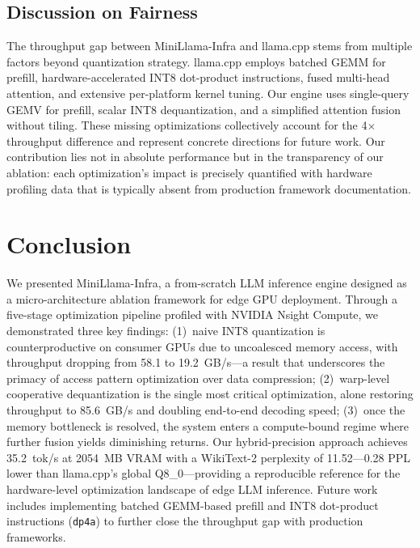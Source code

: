 \documentclass[conference]{IEEEtran}
\begin{document}
\subsection{Discussion on Fairness}
The throughput gap between MiniLlama-Infra and llama.cpp stems from multiple factors beyond quantization strategy. llama.cpp employs batched GEMM for prefill, hardware-accelerated INT8 dot-product instructions, fused multi-head attention, and extensive per-platform kernel tuning. Our engine uses single-query GEMV for prefill, scalar INT8 dequantization, and a simplified attention fusion without tiling. These missing optimizations collectively account for the 4$\times$ throughput difference and represent concrete directions for future work. Our contribution lies not in absolute performance but in the transparency of our ablation: each optimization's impact is precisely quantified with hardware profiling data that is typically absent from production framework documentation.

\section{Conclusion}

We presented MiniLlama-Infra, a from-scratch LLM inference engine designed as a micro-architecture ablation framework for edge GPU deployment. Through a five-stage optimization pipeline profiled with NVIDIA Nsight Compute, we demonstrated three key findings: (1)~naive INT8 quantization is counterproductive on consumer GPUs due to uncoalesced memory access, with throughput dropping from 58.1 to 19.2~GB/s---a result that underscores the primacy of access pattern optimization over data compression; (2)~warp-level cooperative dequantization is the single most critical optimization, alone restoring throughput to 85.6~GB/s and doubling end-to-end decoding speed; (3)~once the memory bottleneck is resolved, the system enters a compute-bound regime where further fusion yields diminishing returns. Our hybrid-precision approach achieves 35.2~tok/s at 2054~MB VRAM with a WikiText-2 perplexity of 11.52---0.28 PPL lower than llama.cpp's global Q8\_0---providing a reproducible reference for the hardware-level optimization landscape of edge LLM inference. Future work includes implementing batched GEMM-based prefill and INT8 dot-product instructions (\texttt{dp4a}) to further close the throughput gap with production frameworks.
\end{document}
